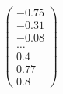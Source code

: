 \documentclass[preview]{standalone}
\begin{document}
\begin{align*}
\begin{pmatrix} -0.75 \\ -0.31 \\ -0.08 \\ \dots \\ 0.4 \\ 0.77 \\ 0.8 \end{pmatrix}
\end{align*}
\end{document}
